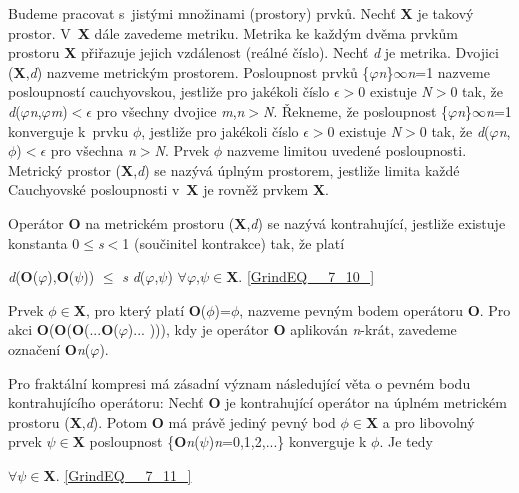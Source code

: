 \noindent 

\noindent Budeme pracovat s~jistými množinami (prostory) prvků. Nechť \textbf{X} je takový prostor. V~\textbf{X} dále zavedeme metriku. Metrika ke každým dvěma prvkům prostoru \textbf{X} přiřazuje jejich vzdálenost (reálné číslo). Nechť \textit{d} je metrika. Dvojici (\textbf{X},\textit{d}) nazveme metrickým prostorem. Posloupnost prvků \{$\varphi$\textit{n}\}$\infty$\textit{n}=1 nazveme posloupností cauchyovskou, jestliže pro jakékoli číslo $\epsilon$$>$0 existuje \textit{N}$>$0 tak, že  \textit{d}($\varphi$\textit{n},$\varphi$\textit{m})$<$$\epsilon$  pro všechny dvojice \textit{m},\textit{n}$>$\textit{N}. Řekneme, že posloupnost \{$\varphi$\textit{n}\}$\infty$\textit{n}=1 konverguje k~prvku $\phi$, jestliže pro jakékoli číslo $\epsilon$$>$0 existuje \textit{N}$>$0 tak, že \textit{d}($\varphi$\textit{n},$\phi$)$<$$\epsilon$ pro všechna \textit{n}$>$\textit{N}. Prvek $\phi$ nazveme limitou uvedené posloupnosti. Metrický prostor (\textbf{X},\textit{d}) se nazývá úplným prostorem, jestliže limita každé Cauchyovské posloupnosti v~\textbf{X} je rovněž prvkem \textbf{X}.

\noindent 

\noindent Operátor \textbf{O} na metrickém prostoru (\textbf{X},\textit{d}) se nazývá kontrahující, jestliže existuje konstanta 0$\leq$\textit{s}$<$1 (součinitel kontrakce) tak, že platí

 \textit{d}(\textbf{O}($\varphi$),\textbf{O}($\psi$)) $\leq$ \textit{s} \textit{d}($\varphi$,$\psi$)  $\forall$$\varphi$,$\psi$$\in$\textbf{X}. \eqref{GrindEQ__7_10_}

\noindent Prvek $\phi$$\in$\textbf{X}, pro který platí \textbf{O}($\phi$)=$\phi$, nazveme pevným bodem operátoru \textbf{O}. Pro akci \textbf{O}(\textbf{O}(\textbf{O}(...\textbf{O}($\varphi$)... ))), kdy je operátor \textbf{O} aplikován \textit{n}-krát, zavedeme označení \textbf{O}\textit{n}($\varphi$).

\noindent 

\noindent Pro fraktální kompresi má zásadní význam následující věta o pevném bodu kontrahujícího operátoru: Nechť \textbf{O} je kontrahující operátor na úplném metrickém prostoru (\textbf{X},\textit{d}). Potom \textbf{O} má právě jediný pevný bod $\phi$$\in$\textbf{X} a pro libovolný prvek $\psi$$\in$\textbf{X} posloupnost \{\textbf{O}\textit{n}($\psi$)\textbar \textit{n}=0,1,2,...\} konverguje k $\phi$. Je tedy

  $\forall$$\psi$$\in$\textbf{X}. \eqref{GrindEQ__7_11_}

